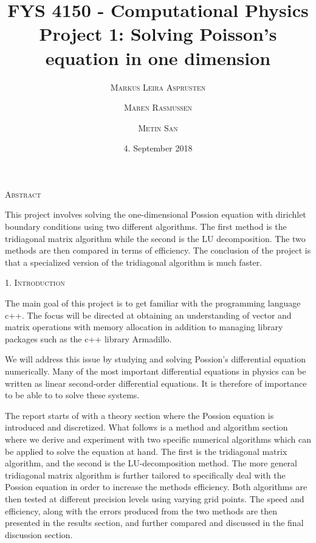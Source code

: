 \documentclass[a4paper,10pt]{article}
\title{FYS 4150 - Computational Physics\\
 Project 1: Solving Poisson's equation in one dimension 
}
\date{\normalsize{4. September 2018} }
\author{\textsc{\small{Markus Leira Asprusten}}
\and \textsc{\small{Maren Rasmussen}}\and \textsc{\small{Metin San}}
 }
\begin{document}
\maketitle
\begin{center}
\textsc{Abstract}
\end{center}

\begin{adjustwidth}{7mm}{7mm}

This project involves solving the one-dimensional Possion equation with dirichlet boundary conditions using two different algorithms. The first method is the tridiagonal matrix algorithm while the second is the LU decomposition. The two methods are then compared in terms of efficiency. The conclusion of the project is that a specialized version of the tridiagonal algorithm is much faster.

\end{adjustwidth}



\bigskip

\begin{center}
\textsc{1. Introduction}
\end{center}
The main goal of this project is to get familiar with the programming language c++. The focus will be directed at obtaining an understanding of vector and matrix operations with memory allocation in addition to managing library packages such as the c++ library Armadillo. 

We will address this issue by studying and solving Possion's differential equation numerically. Many of the most important differential equations in physics can be written as linear second-order differential equations. It is therefore of importance to be able to to solve these systems. 

The report starts of with a theory section where the Possion equation is introduced and discretized.  What follows is a method and algorithm section where we derive and experiment with two specific numerical algorithms which can be applied to solve the equation at hand. The first is the tridiagonal matrix algorithm, and the second is the LU-decomposition method. The more general tridiagonal matrix algorithm is further tailored to specifically deal with the Possion equation in order to increase the methods efficiency. Both algorithms are then tested at different precision levels using varying grid points. The speed and efficiency, along with the errors produced from the two methods are then presented in the results section, and further compared and discussed in the final discussion section.
\end{document}
